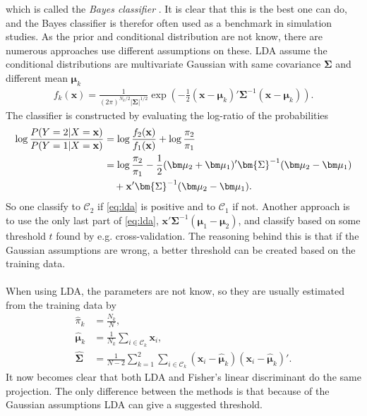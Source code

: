 which is called the \textit{Bayes classifier} \cite[p.~21]{modstat}. It is clear that this is the best one can do, and the Bayes classifier is therefor often used as a benchmark in simulation studies. As the prior and conditional distribution are not know, there are numerous approaches use different assumptions on these. LDA assume the conditional distributions are multivariate Gaussian with same covariance $\bm{\Sigma}$ and different mean $\bm\mu_k$
\begin{align}
  f_k(\mathbf{x}) =  \frac{1}{(2\pi)^{N_k/2}|\bm{\Sigma}|^{1/2}} \exp\left( -\frac{1}{2} (\mathbf{x}-\bm \mu_k)' \bm{\Sigma}^{-1} (\mathbf{x}-\bm \mu_k)\right).
\end{align}
The classifier is constructed by evaluating the log-ratio of the probabilities
\begin{align}
  \label{eq:lda} 
  \log{\frac{P(Y=2|X=\mathbf{x})}{P(Y=1|X=\mathbf{x})}} &= \log{\frac{f_2(\mathbf{x})}{f_1(\mathbf{x})} } + \log{\frac{\pi_2}{\pi_1} } \notag \ \\
  &= \log{\frac{\pi_2}{\pi_1}} -\frac{1}{2} (\bm \mu_2+\bm \mu_1)' \bm{\Sigma}^{-1} (\bm \mu_2-\bm \mu_1) \\
  & \quad + \mathbf{x}'\bm{\Sigma}^{-1} (\bm \mu_2-\bm \mu_1).
  \notag \ 
\end{align}
So one classify to $\mathcal{C}_2$ if \eqref{eq:lda} is positive and to $\mathcal{C}_1$ if not. Another approach is to use the only last part of \eqref{eq:lda}, $\mathbf{x}'\bm{\Sigma}^{-1} (\bm \mu_1-\bm \mu_2)$, and classify based on some threshold $t$ found by e.g. cross-validation. The reasoning behind this is that if the Gaussian assumptions are wrong, a better threshold can be created based on the training data. \\
\\
When using LDA, the parameters are not know, so they are usually estimated from the training data by
\begin{align}
   \hat{\pi}_k &= \frac{N_k}{N},  \\
   \hat{\bm \mu}_k &= \frac{1}{N_k} \sum_{i \in \mathcal{C}_k}\mathbf{x}_i, \\
   \hat{\bm \Sigma} &= \frac{1}{N-2} \sum_{k = 1}^{2} \sum_{i \in \mathcal{C}_k}(\mathbf{x}_i - \hat{\bm{\mu}}_k)(\mathbf{x}_i - \hat{\bm{\mu}}_k)'.
\end{align}
It now becomes clear that both LDA and Fisher's linear discriminant do the same projection. The only difference between the methods is that because of the Gaussian assumptions LDA can give a suggested threshold.
%
